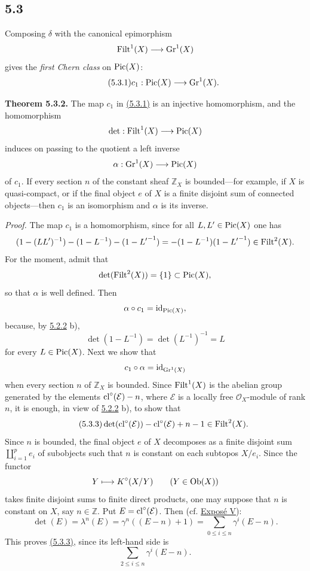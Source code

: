 \subsection*{5.3}
Composing $\delta$ with the canonical epimorphism
\[
\operatorname{Filt}^1(X)\longrightarrow\operatorname{Gr}^1(X)
\]
gives the \emph{first Chern class} on $\operatorname{Pic}(X)$:
\begin{equation}\tag{5.3.1}
c_1:\operatorname{Pic}(X)\longrightarrow\operatorname{Gr}^1(X).
\end{equation}

\textbf{Theorem 5.3.2.}
The map $c_1$ in \hyperlink{sga6.e10.eq.5-3-1}{(5.3.1)} is an injective homomorphism, and the homomorphism
\[
\det:\operatorname{Filt}^1(X)\longrightarrow\operatorname{Pic}(X)
\]
induces on passing to the quotient a left inverse
\[
\alpha:\operatorname{Gr}^1(X)\longrightarrow\operatorname{Pic}(X)
\]
of $c_1$. If every section $n$ of the constant sheaf $\mathbb Z_X$ is
bounded---for example, if $X$ is quasi-compact, or if the final object $e$ of
$X$ is a finite disjoint sum of connected objects---then $c_1$ is an
isomorphism and $\alpha$ is its inverse.

\emph{Proof.}
The map $c_1$ is a homomorphism, since for all $L,L'\in\operatorname{Pic}(X)$ one has
\[
(1-(LL')^{-1})-(1-L^{-1})-(1-{L'}^{-1})
=-(1-L^{-1})(1-{L'}^{-1})\in\operatorname{Filt}^2(X).
\]
For the moment, admit that
\[
\det(\operatorname{Filt}^2(X))=\{1\}\subset\operatorname{Pic}(X),
\]
so that $\alpha$ is well defined. Then
\[
\alpha\circ c_1=\operatorname{id}_{\operatorname{Pic}(X)},
\]
because, by \hyperlink{sga6.e10.rem.5-2-2}{5.2.2} b),
\[
\det(1-L^{-1})=\det(L^{-1})^{-1}=L
\]
for every $L\in\operatorname{Pic}(X)$. Next we show that
\[
c_1\circ\alpha=\operatorname{id}_{\operatorname{Gr}^1(X)}
\]
when every section $n$ of $\mathbb Z_X$ is bounded. Since $\operatorname{Filt}^1(X)$ is
the abelian group generated by the elements $\operatorname{cl}^\circ(\mathcal E)-n$, where
$\mathcal E$ is a locally free $\mathcal O_X$-module of rank $n$, it is
enough, in view of \hyperlink{sga6.e10.rem.5-2-2}{5.2.2} b), to show that
\begin{equation}\tag{5.3.3}
\det(\operatorname{cl}^\circ(\mathcal E))-\operatorname{cl}^\circ(\mathcal E)+n-1\in\operatorname{Filt}^2(X).
\end{equation}
Since $n$ is bounded, the final object $e$ of $X$ decomposes as a finite
disjoint sum $\coprod_{i=1}^p e_i$ of subobjects such that $n$ is constant on
each subtopos $X/e_i$. Since the functor
\[
Y\longmapsto K^\circ(X/Y)\qquad(Y\in\operatorname{Ob}(X))
\]
takes finite disjoint sums to finite direct products, one may suppose that
$n$ is constant on $X$, say $n\in\mathbb Z$. Put
$E=\operatorname{cl}^\circ(\mathcal E)$. Then (cf. \hyperlink{sga6.e05.expose}{Expos\'e V}):
\[
\det(E)=\lambda^n(E)=\gamma^n((E-n)+1)
=\sum_{0\leq i\leq n}\gamma^i(E-n).
\]
This proves \hyperlink{sga6.e10.eq.5-3-3}{(5.3.3)}, since its left-hand side is
\[
\sum_{2\leq i\leq n}\gamma^i(E-n).
\]

